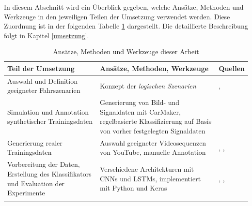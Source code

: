 In diesem Abschnitt wird ein Überblick gegeben, welche Ansätze, Methoden und Werkzeuge in den jeweiligen Teilen der Umsetzung verwendet werden. Diese Zuordnung ist in der folgenden Tabelle \ref{tab_konzept_methods} dargestellt. Die detaillierte Beschreibung folgt in Kapitel \ref{umsetzung}.

\begin{longtable}[c]{p{5cm} p{6.5cm} p{1.5cm}}
\textbf{Teil der Umsetzung} & \textbf{Ansätze, Methoden, Werkzeuge} & \textbf{Quellen} \\
\hline
\endhead

Auswahl und Definition geeigneter Fahrszenarien & Konzept der \textit{logischen Szenarien} & \cite{ulbrich2015defining}, \cite{bagschik2017szenarien} \\
\hline
Simulation und Annotation synthetischer Trainingsdaten & Generierung von Bild- und Signaldaten mit CarMaker, regelbasierte Klassifizierung auf Basis von vorher festgelegten Signaldaten & \cite{ipg2018carmaker} \\
\hline
Generierung realer Trainingsdaten & Auswahl geeigneter Videosequenzen von YouTube, manuelle Annotation & \cite{youtube2018video}, \cite{google2018route1}, \cite{google2018route2} \\
\hline
Vorbereitung der Daten, Erstellung des Klassifikators und Evaluation der Experimente & Verschiedene Architekturen mit \acp{CNN} und \acp{LSTM}, implementiert mit Python und Keras & \cite{chollet2015keras}, \cite{lecun2010convolutional}, \cite{hochreiter1997long} \\

\hline
\caption{Ansätze, Methoden und Werkzeuge dieser Arbeit}
\label{tab_konzept_methods}
\end{longtable}




